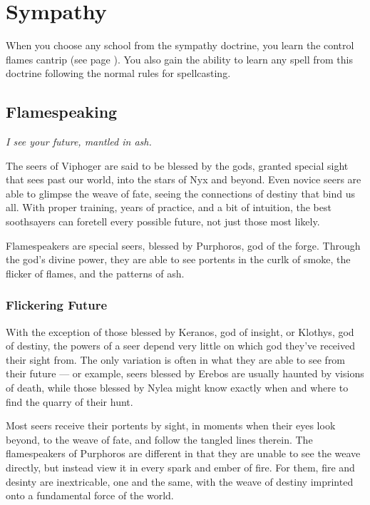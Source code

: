 \section{Sympathy} \label{sec::sympathy}
When you choose any school from the sympathy doctrine, you learn the control flames cantrip (see page \pageref{spell::controlflames}).
You also gain the ability to learn any spell from this doctrine following the normal rules for spellcasting.

\subsection*{Flamespeaking} \label{ssec::flamespeaking}
    \textit{I see your future, mantled in ash.}

    The seers of Viphoger are said to be blessed by the gods, granted special sight that sees past our world, into the stars of Nyx and beyond.
    Even novice seers are able to glimpse the weave of fate, seeing the connections of destiny that bind us all.
    With proper training, years of practice, and a bit of intuition, the best soothsayers can foretell every possible future, not just those most likely.

    Flamespeakers are special seers, blessed by Purphoros, god of the forge.
    Through the god's divine power, they are able to see portents in the curlk of smoke, the flicker of flames, and the patterns of ash.

    \subsubsection{Flickering Future}
        With the exception of those blessed by Keranos, god of insight, or Klothys, god of destiny, the powers of a seer depend very little on which god they've received their sight from.
        The only variation is often in what they are able to see from their future --- or example, seers blessed by Erebos are usually haunted by visions of death, while those blessed by Nylea might know exactly when and where to find the quarry of their hunt.

        Most seers receive their portents by sight, in moments when their eyes look beyond, to the weave of fate, and follow the tangled lines therein.
        The flamespeakers of Purphoros are different in that they are unable to see the weave directly, but instead view it in every spark and ember of fire.
        For them, fire and desinty are inextricable, one and the same, with the weave of destiny imprinted onto a fundamental force of the world.

